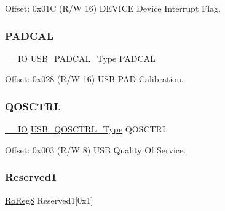 Offset\+: 0x01C (R/W 16) D\+E\+V\+I\+CE Device Interrupt Flag. 

\mbox{\label{struct_usb_device_a446e7b83e50d200ac238425577a31e5a}} 
\subsubsection{\texorpdfstring{PADCAL}{PADCAL}}
{\footnotesize\ttfamily \mbox{\hyperlink{core__cm0plus_8h_aec43007d9998a0a0e01faede4133d6be}{\+\_\+\+\_\+\+IO}} \mbox{\hyperlink{union_u_s_b___p_a_d_c_a_l___type}{U\+S\+B\+\_\+\+P\+A\+D\+C\+A\+L\+\_\+\+Type}} P\+A\+D\+C\+AL}



Offset\+: 0x028 (R/W 16) U\+SB P\+AD Calibration. 

\mbox{\label{struct_usb_device_a9df8751b364843c227b690917f10a4b4}} 
\subsubsection{\texorpdfstring{QOSCTRL}{QOSCTRL}}
{\footnotesize\ttfamily \mbox{\hyperlink{core__cm0plus_8h_aec43007d9998a0a0e01faede4133d6be}{\+\_\+\+\_\+\+IO}} \mbox{\hyperlink{union_u_s_b___q_o_s_c_t_r_l___type}{U\+S\+B\+\_\+\+Q\+O\+S\+C\+T\+R\+L\+\_\+\+Type}} Q\+O\+S\+C\+T\+RL}



Offset\+: 0x003 (R/W 8) U\+SB Quality Of Service. 

\mbox{\label{struct_usb_device_a092866123ac46d0985136e4dca2f36f4}} 
\subsubsection{\texorpdfstring{Reserved1}{Reserved1}}
{\footnotesize\ttfamily \mbox{\hyperlink{group___s_a_m_d21_e15_a__definitions_ga0d957f1433aaf5d70e4dc2b68288442d}{Ro\+Reg8}} Reserved1\mbox{[}0x1\mbox{]}}

\mbox{\label{struct_usb_device_ac615b366d825327aa7079ef09c4b51ad}} 
